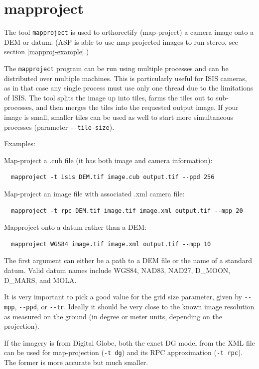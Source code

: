 \clearpage

\section{mapproject}
\label{mapproject}

The tool \texttt{mapproject} is used to orthorectify (map-project) a camera image onto
a DEM or datum. (ASP is able to use map-projected images to run stereo, see section
\ref{mapproj-example}.)

The \texttt{mapproject} program can be run using multiple processes and can be
distributed over multiple machines. This is particularly useful for
ISIS cameras, as in that case any single process must use only one thread
due to the limitations of ISIS.  The tool splits the image up into tiles,
farms the tiles out to sub-processes, and then merges the tiles into the
requested output image. If your image is small, smaller tiles can be used
as well to start more simultaneous processes (parameter \texttt{-\/-tile-size}).

Examples:

Map-project a .cub file (it has both image and camera information):
\begin{verbatim}
  mapproject -t isis DEM.tif image.cub output.tif --ppd 256
\end{verbatim}

Map-project an image file with associated .xml camera file:
\begin{verbatim}
  mapproject -t rpc DEM.tif image.tif image.xml output.tif --mpp 20
\end{verbatim}

Mapproject onto a datum rather than a DEM:
\begin{verbatim}
  mapproject WGS84 image.tif image.xml output.tif --mpp 10
\end{verbatim}

The first argument can either be a path to a DEM file or the name of a standard datum.
Valid datum names include WGS84, NAD83, NAD27, D\_MOON, D\_MARS, and MOLA.

It is very important to pick a good value for the grid size parameter, given by
\texttt{-\/-mpp}, \texttt{-\/-ppd}, or \texttt{-\/-tr}. Ideally it should be very close to the known image resolution
as measured on the ground (in degree or meter units, depending on the projection).

If the imagery is from Digital Globe, both the exact DG model from the XML file
can be used for map-projection (\texttt{-t dg}) and its RPC approximation (\texttt{-t rpc}).
The former is more accurate but much smaller.

